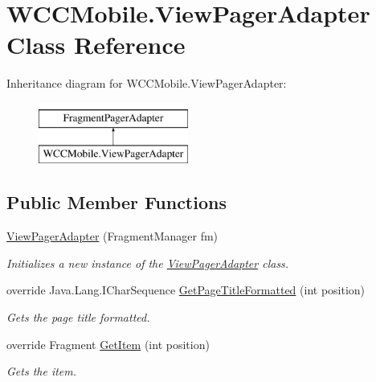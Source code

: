 \hypertarget{class_w_c_c_mobile_1_1_view_pager_adapter}{}\section{W\+C\+C\+Mobile.\+View\+Pager\+Adapter Class Reference}
\label{class_w_c_c_mobile_1_1_view_pager_adapter}
Inheritance diagram for W\+C\+C\+Mobile.\+View\+Pager\+Adapter\+:\begin{figure}[H]
\begin{center}
\leavevmode
\includegraphics[height=2.000000cm]{class_w_c_c_mobile_1_1_view_pager_adapter}
\end{center}
\end{figure}
\subsection*{Public Member Functions}
\begin{DoxyCompactItemize}
\item 
\hyperlink{class_w_c_c_mobile_1_1_view_pager_adapter_ad09dbb7d5a54809a7fc3ae5901881d76}{View\+Pager\+Adapter} (Fragment\+Manager fm)
\begin{DoxyCompactList}\small\item\em Initializes a new instance of the \hyperlink{class_w_c_c_mobile_1_1_view_pager_adapter}{View\+Pager\+Adapter} class. \end{DoxyCompactList}\item 
override Java.\+Lang.\+I\+Char\+Sequence \hyperlink{class_w_c_c_mobile_1_1_view_pager_adapter_a0aed7d4fe5e6daa5da54670b9067ff69}{Get\+Page\+Title\+Formatted} (int position)
\begin{DoxyCompactList}\small\item\em Gets the page title formatted. \end{DoxyCompactList}\item 
override Fragment \hyperlink{class_w_c_c_mobile_1_1_view_pager_adapter_ac237d55d9eea2b67747dd5510bb0e8d6}{Get\+Item} (int position)
\begin{DoxyCompactList}\small\item\em Gets the item. \end{DoxyCompactList}\end{DoxyCompactItemize}
